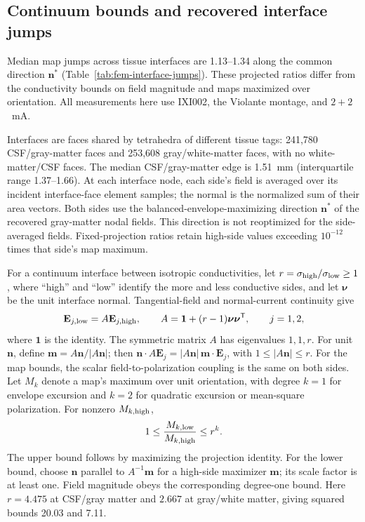 \subsection{Continuum bounds and recovered interface jumps}\label{supp:fem-interfaces}
Median map jumps across tissue interfaces are 1.13--1.34 along the common
direction $\mathbf n^*$ (Table~\ref{tab:fem-interface-jumps}). These
projected ratios differ from the conductivity bounds on field magnitude
and maps maximized over orientation. All measurements here use IXI002,
the Violante montage, and $2+2$~mA.

Interfaces are faces shared by tetrahedra of different tissue tags:
241,780 CSF/gray-matter faces and 253,608 gray/white-matter faces, with no
white-matter/CSF faces. The median CSF/gray-matter edge is 1.51~mm
(interquartile range 1.37--1.66). At each interface node, each side's field
is averaged over its incident interface-face element samples; the normal
is the normalized sum of their area vectors. Both sides use the
balanced-envelope-maximizing direction $\mathbf n^*$ of the recovered
gray-matter nodal fields. This direction is not reoptimized for the
side-averaged fields. Fixed-projection ratios retain high-side values
exceeding $10^{-12}$ times that side's map maximum.

For a continuum interface between isotropic conductivities, let
$r=\sigma_{\rm high}/\sigma_{\rm low}\geq1$, where ``high'' and ``low''
identify the more and less conductive sides, and let $\boldsymbol\nu$ be
the unit interface normal. Tangential-field and normal-current continuity give
\begin{equation}
\mathbf E_{j,\rm low}=A\mathbf E_{j,\rm high},\qquad
A=\mathbf 1+(r-1)\boldsymbol\nu\boldsymbol\nu^{\mathsf T},\qquad j=1,2,
\label{eq:fem-interface-transform}
\end{equation}
where $\mathbf 1$ is the identity. The symmetric matrix $A$ has eigenvalues
$1,1,r$. For unit $\mathbf n$, define
$\mathbf m=A\mathbf n/|A\mathbf n|$; then
$\mathbf n\cdot A\mathbf E_j=|A\mathbf n|\,\mathbf m\cdot\mathbf E_j$,
with $1\leq|A\mathbf n|\leq r$.
For the map bounds, the scalar field-to-polarization coupling is the same
on both sides. Let $M_k$ denote a map's maximum over unit orientation, with degree $k=1$
for envelope excursion and $k=2$ for quadratic excursion or mean-square
polarization. For nonzero $M_{k,\rm high}$,
\begin{equation}
1\leq\frac{M_{k,\rm low}}{M_{k,\rm high}}\leq r^k.
\label{eq:fem-interface-bound}
\end{equation}
The upper bound follows by maximizing the projection identity. For the lower
bound, choose $\mathbf n$ parallel to $A^{-1}\mathbf m$ for a high-side
maximizer $\mathbf m$; its scale factor is at least one. Field magnitude
obeys the corresponding degree-one bound. Here $r=4.475$ at CSF/gray matter
and $2.667$ at gray/white matter, giving squared bounds 20.03 and 7.11.

